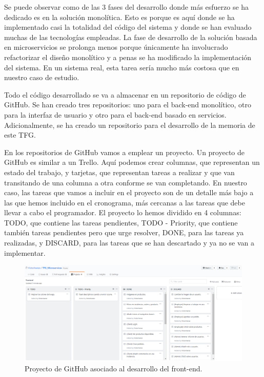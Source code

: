 \documentclass[11pt,spanish,listoffigures]{tfgetsinf}
\begin{document}
Se puede observar como de las 3 fases del desarrollo donde más esfuerzo se ha dedicado es en la solución monolítica. Esto es porque es aquí donde se ha implementado casi la totalidad del código del sistema y donde se han evaluado muchas de las tecnologías empleadas. La fase de desarrollo de la solución basada en microservicios se prolonga menos porque únicamente ha involucrado refactorizar el diseño monolítico y a penas se ha modificado la implementación del sistema. En un sistema real, esta tarea sería mucho más costosa que en nuestro caso de estudio.

Todo el código desarrollado se va a almacenar en un repositorio de código de GitHub. Se han creado tres repositorios: uno para el back-end monolítico, otro para la interfaz de usuario y otro para el back-end basado en servicios. Adicionalmente, se ha creado un repositorio para el desarrollo de la memoria de este TFG.

En los repositorios de GitHub vamos a emplear un proyecto. Un proyecto de GitHub es similar a un Trello. Aquí podemos crear columnas, que representan un estado del trabajo, y tarjetas, que representan tareas a realizar y que van transitando de una columna a otra conforme se van completando. En nuestro caso, las tareas que vamos a incluir en el proyecto son de un detalle más bajo a las que hemos incluido en el cronograma, más cercanas a las tareas que debe llevar a cabo el programador. El proyecto lo hemos dividido en 4 columnas: TODO, que contiene las tareas pendientes, TODO - Priority, que contiene también tareas pendientes pero que urge resolver, DONE, para las tareas ya realizadas, y DISCARD, para las tareas que se han descartado y ya no se van a implementar.

\begin{figure}[h]
\centering
\includegraphics[scale=0.35]{GitHubProject}
\caption{Proyecto de GitHub asociado al desarrollo del front-end.}
\end{figure}
\end{document}
